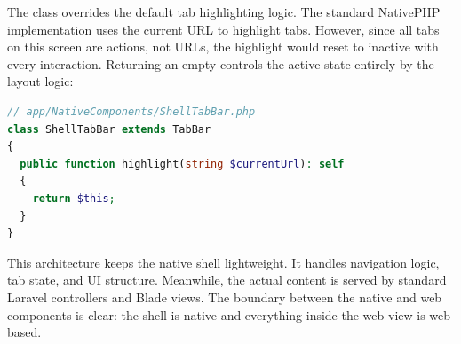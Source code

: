 The  class overrides the default tab highlighting logic. The standard NativePHP
implementation uses the current URL to highlight tabs. However, since all tabs on this screen
are actions, not URLs, the highlight would reset to inactive with every interaction. Returning
an empty  controls the active state entirely by the layout logic:

\begin{lstlisting}[language=php]
// app/NativeComponents/ShellTabBar.php
class ShellTabBar extends TabBar
{
  public function highlight(string $currentUrl): self
  {
    return $this;
  }
}
\end{lstlisting}

\noindent This architecture keeps the native shell lightweight. It handles navigation logic, tab
state, and UI structure. Meanwhile, the actual content is served by standard Laravel controllers
and Blade views. The boundary between the native and web components is clear: the shell is
native and everything inside the web view is web-based.
